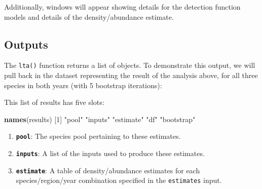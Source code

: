 \documentclass[
]{book}
\newenvironment{Shaded}{\begin{snugshade}}{\end{snugshade}}
\newcommand{\DecValTok}[1]{\textcolor[rgb]{0.00,0.00,0.81}{#1}}
\newcommand{\KeywordTok}[1]{\textcolor[rgb]{0.13,0.29,0.53}{\textbf{#1}}}
\newcommand{\NormalTok}[1]{#1}
\newcommand{\StringTok}[1]{\textcolor[rgb]{0.31,0.60,0.02}{#1}}
\begin{document}
Additionally, windows will appear showing details for the detection function models and details of the density/abundance estimate.

\hypertarget{outputs}{%
\subsection*{Outputs}\label{outputs}}

The \texttt{lta()} function returns a list of objects. To demonstrate this output, we will pull back in the dataset representing the result of the analysis above, for all three species in both years (with 5 bootstrap iterations):

This list of results has five slots:

\begin{Shaded}
\begin{Highlighting}[]
\KeywordTok{names}\NormalTok{(results)}
\NormalTok{[}\DecValTok{1}\NormalTok{] }\StringTok{"pool"}      \StringTok{"inputs"}    \StringTok{"estimate"}  \StringTok{"df"}        \StringTok{"bootstrap"}
\end{Highlighting}
\end{Shaded}

\begin{enumerate}
\def\labelenumi{(\arabic{enumi})}
\item
  \textbf{\texttt{pool}}: The species pool pertaining to these estimates.
\item
  \textbf{\texttt{inputs}}: A list of the inputs used to produce these estimates.
\item
  \textbf{\texttt{estimate}}: A table of density/abundance estimates for each species/region/year combination specified in the \texttt{estimates} input.
\end{enumerate}
\end{document}
